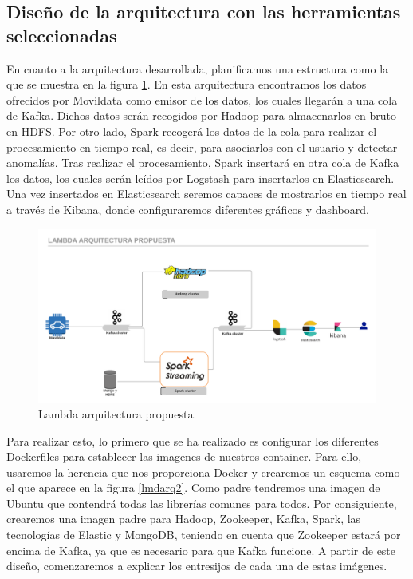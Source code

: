 \subsection{Diseño de la arquitectura con las herramientas seleccionadas\label{disenio}}

En cuanto a la arquitectura desarrollada, planificamos una estructura como la que se muestra en la figura \ref{lmdarq1}. En esta arquitectura encontramos los datos ofrecidos por Movildata como emisor de los datos, los cuales llegarán a una cola de Kafka. Dichos datos serán recogidos por Hadoop para almacenarlos en bruto en HDFS. Por otro lado, Spark recogerá los datos de la cola para realizar el procesamiento en tiempo real, es decir, para asociarlos con el usuario y detectar anomalías. Tras realizar el procesamiento, Spark insertará en otra cola de Kafka los datos, los cuales serán leídos por Logstash para insertarlos en Elasticsearch. Una vez insertados en Elasticsearch seremos capaces de mostrarlos en tiempo real a través de Kibana, donde configuraremos diferentes gráficos y dashboard.

\begin{figure}[htp]
\centering
\includegraphics[scale=0.26]{Imagenes/arqProp1.png}
\caption{Lambda arquitectura propuesta.}
\label{lmdarq1}
\end{figure}

Para realizar esto, lo primero que se ha realizado es configurar los diferentes Dockerfiles para establecer las imagenes de nuestros container. Para ello, usaremos la herencia que nos proporciona Docker y crearemos un esquema como el que aparece en la figura \ref{lmdarq2}. Como padre tendremos una imagen de Ubuntu que contendrá todas las librerías comunes para todos. Por consiguiente, crearemos una imagen padre para Hadoop, Zookeeper, Kafka, Spark, las tecnologías de Elastic y MongoDB, teniendo en cuenta que Zookeeper estará por encima de Kafka, ya que es necesario para que Kafka funcione. A partir de este diseño, comenzaremos a explicar los entresijos de cada una de estas imágenes.

